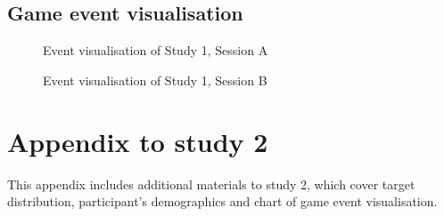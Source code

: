 \section{Game event visualisation}\label{app:vis1}
\begin{figure}[H]
  \centering
  \caption{Event visualisation of Study 1, Session A}
  
\end{figure}

\begin{figure}[H]
  \centering
  \caption{Event visualisation of Study 1, Session B}
 
\end{figure}



\chapter{Appendix to study 2}
This appendix includes additional materials to study 2, which cover target distribution, participant's demographics and chart of game event visualisation.


